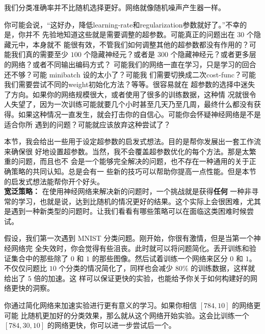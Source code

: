 我们分类准确率并不比随机选择更好。网络就像随机噪声产生器一样。

你可能会说，“这好办，降低\gls*{learning-rate}和\gls*{regularization}参数就好了。”不幸的是，你并不
先验地知道这些就是需要调整的超参数。可能真正的问题出在 $30$ 个隐藏元中，本身就不
能很有效，不管我们如何调整其他的超参数都没有作用的？可能我们真的需要至少 $100$
个隐藏神经元？或者是 $300$ 个隐藏神经元？或者更多层的网络？或者不同输出编码方式？
可能我们的网络一直在学习，只是学习的回合还不够？可能 minibatch 设的太小了？可能我
们需要切换成二次\gls*{cost-func}？可能我们需要尝试不同的\gls*{weight}初始化方法？等等。很容易就在
超参数的选择中迷失了方向。如果你的网络规模很大，或者使用了很多的训练数据，这种情
况就很令人失望了，因为一次训练可能就要几个小时甚至几天乃至几周，最终什么都没有获
得。如果这种情况一直发生，就会打击你的自信心。可能你会怀疑神经网络是不是适合你所
遇到的问题？可能就应该放弃这种尝试了？

本节，我会给出一些用于设定超参数的启发式想法。目的是帮你发展出一套工作流来确保很
好地设置超参数。当然，我不会覆盖超参数优化的每个方法。那是太繁重的问题，而且也不
会是一个能够完全解决的问题，也不存在一种通用的关于正确策略的共同认知。总是会有一
些新的技巧可以帮助你提高一点性能。但是本节的启发式想法能帮你开个好头。\\

\textbf{宽泛策略：} 在使用神经网络来解决新的问题时，一个挑战就是获得\textbf{任何}
一种非寻常的学习，也就是说，达到比随机的情况更好的结果。这个实际上会很困难，尤其
是遇到一种新类型的问题时。让我们看看有哪些策略可以在面临这类困难时候尝试。

假设，我们第一次遇到 MNIST 分类问题。刚开始，你很有激情，但是当第一个神经网络完
全失效时，你会觉得有些沮丧。此时就可以将问题简化。丢开训练和验证集合中的那些除了
$0$ 和 $1$ 的那些图像。然后试着训练一个网络来区分 $0$ 和 $1$。不仅仅问题比 $10$
个分类的情况简化了，同样也会减少 80\% 的训练数据，这样就给出了 $5$ 倍的加速。这
样可以保证更快的实验，也能给予你关于如何构建好的网络更快的洞察。

你通过简化网络来加速实验进行更有意义的学习。如果你相信 $[784, 10]$ 的网络更可能
比随机更加好的分类效果，那么就从这个网络开始实验。这会比训练一个 $[784, 30 ,10]$
的网络更快，你可以进一步尝试后一个。

